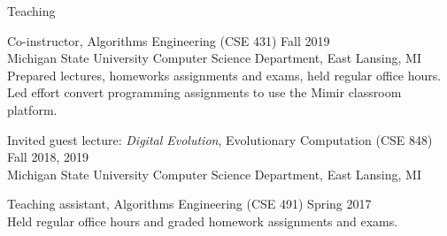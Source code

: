 \begin{rSection}{Teaching}

Co-instructor, Algorithms Engineering (CSE 431)
\hfill Fall 2019 \\
\tab Michigan State University Computer Science Department, East Lansing, MI \\
\tab Prepared lectures, homeworks assignments and exams, held regular office hours. \\
\tab Led effort convert programming assignments to use the Mimir classroom platform.

Invited guest lecture: \textit{Digital Evolution}, Evolutionary Computation (CSE 848)
\hfill Fall 2018, 2019 \\
\tab Michigan State University Computer Science Department, East Lansing, MI

Teaching assistant, Algorithms Engineering (CSE 491)
\hfill Spring 2017 \hfill \\
\tab Held regular office hours and graded homework assignments and exams.

\end{rSection}